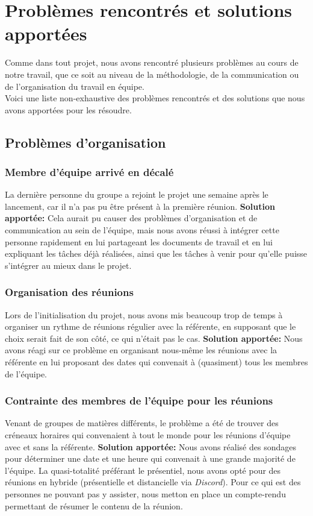 \documentclass[12pt,a4paper]{article}
\begin{document}
\pagebreak


\section{Problèmes rencontrés et solutions apportées}\label{sec:problems}
Comme dans tout projet, nous avons rencontré plusieurs problèmes au cours de notre travail,
que ce soit au niveau de la méthodologie, de la communication ou de l'organisation du travail en équipe.\\
Voici une liste non-exhaustive des problèmes rencontrés et des solutions que nous avons apportées pour les résoudre.
\subsection{Problèmes d'organisation}
\subsubsection{Membre d'équipe arrivé en décalé}
La dernière personne du groupe a rejoint le projet une semaine après 
le lancement, car il n'a pas pu être présent à la première réunion. \smallbreak
\hspace{0.5cm}\textbf{Solution apportée:} Cela aurait pu causer des problèmes d'organisation et de communication au sein de l'équipe, 
mais nous avons réussi à intégrer cette personne rapidement en lui partageant les documents de travail et en lui expliquant 
les tâches déjà réalisées, ainsi que les tâches à venir pour qu'elle puisse s'intégrer au mieux dans le projet.
\subsubsection{Organisation des réunions}
Lors de l'initialisation du projet, nous avons mis beaucoup trop de temps à organiser un rythme de réunions régulier
avec la référente, en supposant que le choix serait fait de son côté, ce qui n'était pas le cas. \smallbreak
\hspace{0.5cm}\textbf{Solution apportée:} Nous avons réagi sur ce problème en organisant nous-même les réunions
avec la référente en lui proposant des dates qui convenait à (quasiment) tous les membres de l'équipe. 
\subsubsection{Contrainte des membres de l'équipe pour les réunions}
Venant de groupes de matières différents, le problème a été de trouver des créneaux horaires qui convenaient 
à tout le monde pour les réunions d'équipe avec et sans la référente. \smallbreak
\hspace{0.5cm}\textbf{Solution apportée:} Nous avons réalisé des sondages pour déterminer une date et une heure qui convenait à une grande majorité de l'équipe.
La quasi-totalité préférant le présentiel, nous avons opté pour des réunions en hybride (présentielle et distancielle via \textit{Discord}).
Pour ce qui est des personnes ne pouvant pas y assister, nous metton en place un compte-rendu permettant de résumer le contenu de la réunion.
\end{document}
